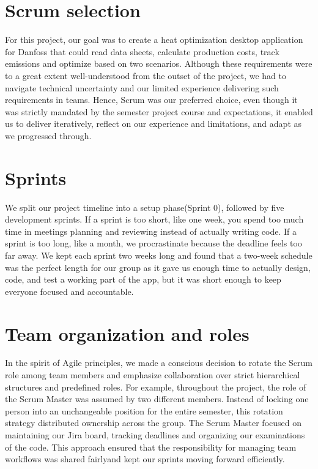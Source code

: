 \section{Scrum selection}

For this project, our goal was to create a heat optimization desktop application for Danfoss that could read data sheets, calculate production costs, track emissions and optimize based on two scenarios. Although these requirements were to a great extent well-understood from the outset of the project, we had to navigate technical uncertainty and our limited experience delivering such requirements in teams. Hence, Scrum was our preferred choice, even though it was strictly mandated by the semester project course and expectations, it enabled us to deliver iteratively, reflect on our experience and limitations, and adapt as we progressed through.

\section{Sprints}

We split our project timeline into a setup phase(Sprint 0), followed by five development sprints. If a sprint is too short, like one week, you spend too much time in meetings planning and reviewing instead of actually writing code. If a sprint is too long, like a month, we procrastinate because the deadline feels too far away. We kept each sprint two weeks long and found that a two-week schedule was the perfect length for our group as it gave us enough time to actually design, code, and test a working part of the app, but it was short enough to keep everyone focused and accountable.

\section{Team organization and roles}

In the spirit of Agile principles, we made a conscious decision to rotate the Scrum role among team members and emphasize collaboration over strict hierarchical structures and predefined roles. For example, throughout the project, the role of the Scrum Master was assumed by two different members. Instead of locking one person into an unchangeable position for the entire semester, this rotation strategy distributed ownership across the group. The Scrum Master focused on maintaining our Jira board, tracking deadlines and organizing our examinations of the code. This approach ensured that the responsibility for managing team workflows was shared fairlyand kept our sprints moving forward efficiently.

